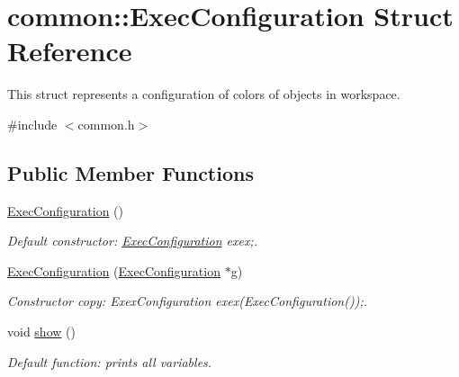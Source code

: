 \hypertarget{structcommon_1_1ExecConfiguration}{\section{common\-:\-:Exec\-Configuration Struct Reference}
\label{structcommon_1_1ExecConfiguration}
}


This struct represents a configuration of colors of objects in workspace.  




{\ttfamily \#include $<$common.\-h$>$}

\subsection*{Public Member Functions}
\begin{DoxyCompactItemize}
\item 
\hypertarget{structcommon_1_1ExecConfiguration_ae71329df20ba52327f33287c50663ac1}{\hyperlink{structcommon_1_1ExecConfiguration_ae71329df20ba52327f33287c50663ac1}{Exec\-Configuration} ()}\label{structcommon_1_1ExecConfiguration_ae71329df20ba52327f33287c50663ac1}

\begin{DoxyCompactList}\small\item\em Default constructor\-: \hyperlink{structcommon_1_1ExecConfiguration}{Exec\-Configuration} exex;. \end{DoxyCompactList}\item 
\hypertarget{structcommon_1_1ExecConfiguration_acdd086538b27972751b0b18f78a45e01}{\hyperlink{structcommon_1_1ExecConfiguration_acdd086538b27972751b0b18f78a45e01}{Exec\-Configuration} (\hyperlink{structcommon_1_1ExecConfiguration}{Exec\-Configuration} $\ast$g)}\label{structcommon_1_1ExecConfiguration_acdd086538b27972751b0b18f78a45e01}

\begin{DoxyCompactList}\small\item\em Constructor copy\-: Exex\-Configuration exex(\-Exec\-Configuration());. \end{DoxyCompactList}\item 
\hypertarget{structcommon_1_1ExecConfiguration_a428c6689fbc17376db7304dd61f3d69b}{void \hyperlink{structcommon_1_1ExecConfiguration_a428c6689fbc17376db7304dd61f3d69b}{show} ()}\label{structcommon_1_1ExecConfiguration_a428c6689fbc17376db7304dd61f3d69b}

\begin{DoxyCompactList}\small\item\em Default function\-: prints all variables. \end{DoxyCompactList}\end{DoxyCompactItemize}
